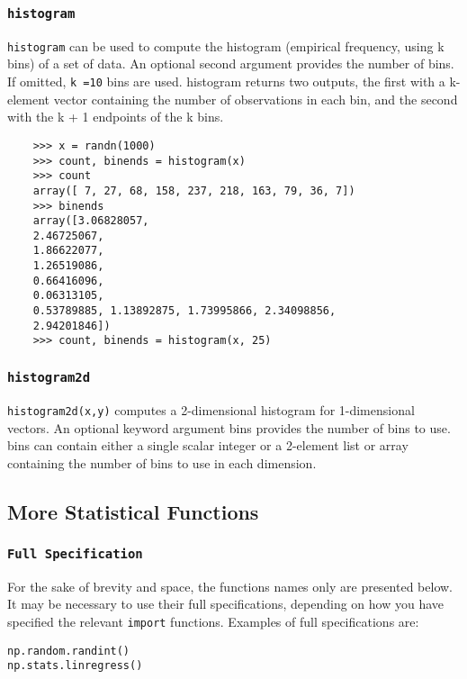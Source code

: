\documentclass[KSmain.tex]{subfiles}
\begin{document}
\subsubsection*{\texttt{histogram}}
\texttt{histogram} can be used to compute the histogram (empirical frequency, using k bins) of a set of data. An
optional second argument provides the number of bins. If omitted, \texttt{k =10} bins are used. histogram returns
two outputs, the first with a k-element vector containing the number of observations in each bin, and the
second with the k + 1 endpoints of the k bins.
\begin{framed}
	\begin{verbatim}
	>>> x = randn(1000)
	>>> count, binends = histogram(x)
	>>> count
	array([ 7, 27, 68, 158, 237, 218, 163, 79, 36, 7])
	>>> binends
	array([3.06828057,
	2.46725067,
	1.86622077,
	1.26519086,
	0.66416096,
	0.06313105,
	0.53789885, 1.13892875, 1.73995866, 2.34098856,
	2.94201846])
	>>> count, binends = histogram(x, 25)
	\end{verbatim}
\end{framed}
\subsubsection*{\texttt{histogram2d}}
\texttt{histogram2d(x,y)} computes a 2-dimensional histogram for 1-dimensional vectors. An optional keyword
argument bins provides the number of bins to use. bins can contain either a single scalar integer or a
2-element list or array containing the number of bins to use in each dimension.

\subsection{More Statistical Functions}
\subsubsection*{\texttt{Full Specification}}

For the sake of brevity and space, the functions names only are presented below.
It may be necessary to use their full specifications, depending on how you have specified the relevant \texttt{import} functions.
Examples of full specifications are:
\begin{framed}
\begin{verbatim}
np.random.randint()
np.stats.linregress()
\end{verbatim}
\end{framed}
\end{document}
